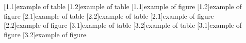 \documentclass[fontsize=11pt]{scrreprt}
\begin{document}
\tableofcontents
\listoftables
\listoffigures
\blinddocument
{}[1.1]{example of table}
[1.2]{example of table}
[1.1]{example of figure}
[1.2]{example of figure}
\blinddocument
{}[2.1]{example of table}
[2.2]{example of table}
[2.1]{example of figure}
[2.2]{example of figure}
\blinddocument
{}[3.1]{example of table}
[3.2]{example of table}
[3.1]{example of figure}
[3.2]{example of figure}
\end{document}
